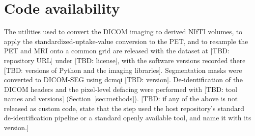 
\section*{Code availability}\label{sec:code}

The utilities used to convert the DICOM imaging to derived NIfTI volumes, to apply the standardized-uptake-value conversion to the PET, and to resample the PET and MRI onto a common grid are released with the dataset at [TBD: repository URL] under [TBD: license], with the software versions recorded there [TBD: versions of Python and the imaging libraries].
Segmentation masks were converted to DICOM-SEG using dcmqi [TBD: version].
De-identification of the DICOM headers and the pixel-level defacing were performed with [TBD: tool names and versions] (Section~\ref{sec:methods}).
[TBD: if any of the above is not released as custom code, state that the step used the host repository's standard de-identification pipeline or a standard openly available tool, and name it with its version.]
